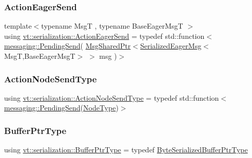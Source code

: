 \mbox{\label{namespacevt_1_1serialization_a009aa1de8d42a3c97643b947fcc6f0b6}} 
\subsubsection{\texorpdfstring{Action\+Eager\+Send}{ActionEagerSend}}
{\footnotesize\ttfamily template$<$typename MsgT , typename Base\+Eager\+MsgT $>$ \\
using \hyperlink{namespacevt_1_1serialization_a009aa1de8d42a3c97643b947fcc6f0b6}{vt\+::serialization\+::\+Action\+Eager\+Send} = typedef std\+::function$<$\hyperlink{structvt_1_1messaging_1_1_pending_send}{messaging\+::\+Pending\+Send}( \hyperlink{namespacevt_ab2b3d506ec8e8d1540aede826d84a239}{Msg\+Shared\+Ptr}$<$\hyperlink{namespacevt_1_1serialization_ac8b37425f8316a800cdb0b0f0f8a6438}{Serialized\+Eager\+Msg}$<$MsgT,Base\+Eager\+MsgT$>$ $>$ msg )$>$}

\mbox{\label{namespacevt_1_1serialization_ad4f189ca4817d31b73436c92bca55deb}} 
\subsubsection{\texorpdfstring{Action\+Node\+Send\+Type}{ActionNodeSendType}}
{\footnotesize\ttfamily using \hyperlink{namespacevt_1_1serialization_ad4f189ca4817d31b73436c92bca55deb}{vt\+::serialization\+::\+Action\+Node\+Send\+Type} = typedef std\+::function$<$\hyperlink{structvt_1_1messaging_1_1_pending_send}{messaging\+::\+Pending\+Send}(\hyperlink{namespacevt_a866da9d0efc19c0a1ce79e9e492f47e2}{Node\+Type})$>$}

\mbox{\label{namespacevt_1_1serialization_a88fa9b491e54f71b1a16d8464e5fc0a9}} 
\subsubsection{\texorpdfstring{Buffer\+Ptr\+Type}{BufferPtrType}}
{\footnotesize\ttfamily using \hyperlink{namespacevt_1_1serialization_a88fa9b491e54f71b1a16d8464e5fc0a9}{vt\+::serialization\+::\+Buffer\+Ptr\+Type} = typedef \hyperlink{namespacevt_1_1serialization_a8f2372c7f89aee28287323667fac2cf5}{Byte\+Serialized\+Buffer\+Ptr\+Type}}

